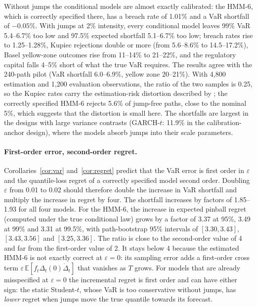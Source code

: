 \documentclass[11pt,a4paper]{article}
\theoremstyle{definition}
\theoremstyle{remark}
\newcommand{\E}{\mathbb{E}}
\begin{document}
Without jumps the conditional models are almost exactly calibrated: the HMM-6, which is correctly specified there, has a breach rate of 1.01\% and a VaR shortfall of $-0.05\%$. With jumps at 2\% intensity, every conditional model leaves 99\% VaR 5.4--6.7\% too low and 97.5\% expected shortfall 5.1--6.7\% too low; breach rates rise to 1.25--1.28\%, Kupiec rejections double or more (from 5.6--8.6\% to 14.5--17.2\%), Basel yellow-zone outcomes rise from 11--14\% to 21--22\%, and the regulatory capital falls 4--5\% short of what the true VaR requires. The results agree with the 240-path pilot (VaR shortfall 6.0--6.9\%, yellow zone 20--21\%). With 4{,}800 estimation and 1{,}200 evaluation observations, the ratio of the two samples is 0.25, so the Kupiec rates carry the estimation-risk distortion described by \citet{escanciano2010}; the correctly specified HMM-6 rejects 5.6\% of jump-free paths, close to the nominal 5\%, which suggests that the distortion is small here. The shortfalls are largest in the designs with large variance contrasts (GARCH-$t$: 11.9\% in the calibration-anchor design), where the models absorb jumps into their scale parameters.

\paragraph{First-order error, second-order regret.} Corollaries~\ref{cor:var} and~\ref{cor:regret} predict that the VaR error is first order in $\varepsilon$ and the quantile-loss regret of a correctly specified model second order. Doubling $\varepsilon$ from 0.01 to 0.02 should therefore double the increase in VaR shortfall and multiply the increase in regret by four. The shortfall increases by factors of 1.85--1.93 for all four models. For the HMM-6, the increase in expected pinball regret (computed under the true conditional law) grows by a factor of 3.37 at 95\%, 3.49 at 99\% and 3.31 at 99.5\%, with path-bootstrap 95\% intervals of $[3.30,3.43]$, $[3.43,3.56]$ and $[3.25,3.36]$. The ratio is close to the second-order value of 4 and far from the first-order value of 2. It stays below 4 because the estimated HMM-6 is not exactly correct at $\varepsilon=0$: its sampling error adds a first-order cross term $\varepsilon\,\E[f_t\Delta_t(0)\dot\Delta_t]$ that vanishes as $T$ grows. For models that are already misspecified at $\varepsilon=0$ the incremental regret is first order and can have either sign: the static Student-$t$, whose VaR is too conservative without jumps, has \emph{lower} regret when jumps move the true quantile towards its forecast.
\end{document}
